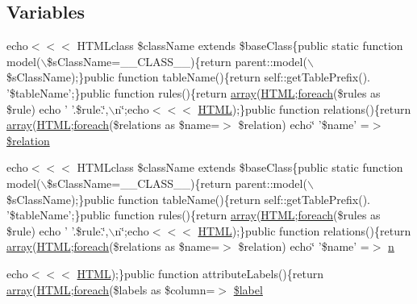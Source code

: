\subsection*{Variables}
\begin{DoxyCompactItemize}
\item 
echo$<$$<$$<$ HTMLclass \$className extends \$baseClass\{public static function model($\backslash$\$sClassName=\_\-\_\-CLASS\_\-\_\-)\{return parent::model($\backslash$\$sClassName);\}public function tableName()\{return self::getTablePrefix(). '\$tableName';\}public function rules()\{return \hyperlink{list_8php_aa3205d038c7f8feb5c9f01ac4dfadc88}{array}(\hyperlink{module_8php_a2c8135527015cd4586959ac7c2ffec92}{HTML};\hyperlink{example_2scripts_2check_8php_ac6aafbc4d90cd74f481282f505f6c628}{foreach}(\$rules as \$rule) echo ' '.\$rule.\char`\"{},$\backslash$n\char`\"{};echo$<$$<$$<$ \hyperlink{module_8php_a2c8135527015cd4586959ac7c2ffec92}{HTML});\}public function relations()\{return \hyperlink{list_8php_aa3205d038c7f8feb5c9f01ac4dfadc88}{array}(\hyperlink{module_8php_a2c8135527015cd4586959ac7c2ffec92}{HTML};\hyperlink{example_2scripts_2check_8php_ac6aafbc4d90cd74f481282f505f6c628}{foreach}(\$relations as \$name=$>$ \$relation) echo\char`\"{} '\$name' =$>$ \hyperlink{templates_2model_2model_8php_a071d5a15ecc5f0db7b14df0dca0c6e47}{\$relation}
\item 
echo$<$$<$$<$ HTMLclass \$className extends \$baseClass\{public static function model($\backslash$\$sClassName=\_\-\_\-CLASS\_\-\_\-)\{return parent::model($\backslash$\$sClassName);\}public function tableName()\{return self::getTablePrefix(). '\$tableName';\}public function rules()\{return \hyperlink{list_8php_aa3205d038c7f8feb5c9f01ac4dfadc88}{array}(\hyperlink{module_8php_a2c8135527015cd4586959ac7c2ffec92}{HTML};\hyperlink{example_2scripts_2check_8php_ac6aafbc4d90cd74f481282f505f6c628}{foreach}(\$rules as \$rule) echo ' '.\$rule.\char`\"{},$\backslash$n\char`\"{};echo$<$$<$$<$ \hyperlink{module_8php_a2c8135527015cd4586959ac7c2ffec92}{HTML});\}public function relations()\{return \hyperlink{list_8php_aa3205d038c7f8feb5c9f01ac4dfadc88}{array}(\hyperlink{module_8php_a2c8135527015cd4586959ac7c2ffec92}{HTML};\hyperlink{example_2scripts_2check_8php_ac6aafbc4d90cd74f481282f505f6c628}{foreach}(\$relations as \$name=$>$ \$relation) echo\char`\"{} '\$name' =$>$ \hyperlink{templates_2model_2model_8php_a379b45186169096aa004a82fc6fee26d}{n}
\item 
echo$<$$<$$<$ \hyperlink{module_8php_a2c8135527015cd4586959ac7c2ffec92}{HTML});\}public function attributeLabels()\{return \hyperlink{list_8php_aa3205d038c7f8feb5c9f01ac4dfadc88}{array}(\hyperlink{module_8php_a2c8135527015cd4586959ac7c2ffec92}{HTML};\hyperlink{example_2scripts_2check_8php_ac6aafbc4d90cd74f481282f505f6c628}{foreach}(\$labels as \$column=$>$ \hyperlink{templates_2model_2model_8php_a0bf7b9a135bed8ed3dcd4c376c25b88b}{\$label}
\end{DoxyCompactItemize}


